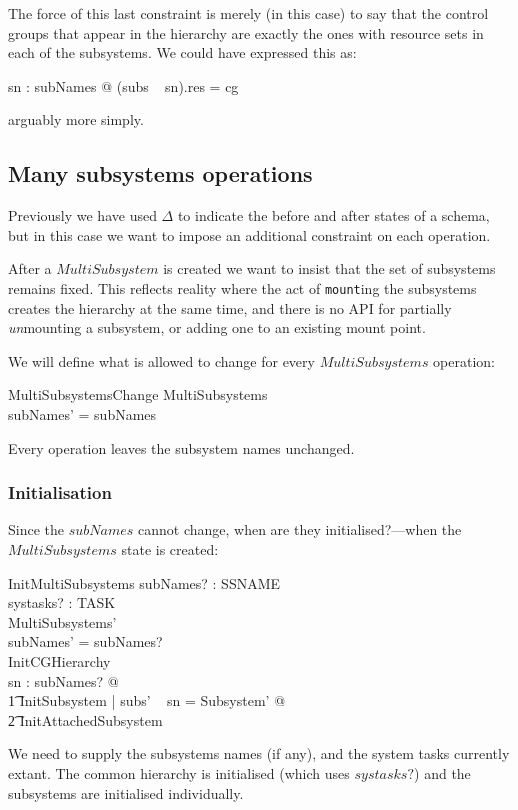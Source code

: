 \documentclass[a4paper,twoside,12pt]{article}
\begin{document}
The force of this last constraint is merely (in this case) to say that the control groups that appear in the
hierarchy are exactly the ones with resource sets in each of the subsystems. We could have expressed this as:

\begin{zed}
\forall sn : subNames @ \dom (subs ~ sn).res = \dom cg
\end{zed}
arguably more simply.

\subsection{Many subsystems operations}

Previously we have used $\Delta$ to indicate the before and after states of a schema, but in this case we want to
impose an additional constraint on each operation. 

After a $MultiSubsystem$ is created we want to insist that
the set of subsystems remains fixed. This reflects reality where the act of \texttt{mount}ing the subsystems creates the
hierarchy at the same time, and there is no API for partially \emph{un}mounting a subsystem, or adding one to an existing mount point.

We will define what is allowed to change for every $MultiSubsystems$ operation:

\begin{schema}{MultiSubsystemsChange}
\Delta MultiSubsystems \\
\where
subNames' = subNames \\
\end{schema}
Every operation leaves the subsystem names unchanged.

\subsubsection{Initialisation}

Since the $subNames$ cannot change, when are they initialised?---when the $MultiSubsystems$ state is created:

\begin{schema}{InitMultiSubsystems}
subNames? : \finset SSNAME \\
systasks? : \finset TASK \\
MultiSubsystems' \\
\where
subNames' = subNames? \\
InitCGHierarchy \\
\forall sn : subNames? @ \\
	\t1 \exists InitSubsystem | subs' ~ sn = \theta Subsystem' @ \\
		\t2 InitAttachedSubsystem 
\end{schema}
We need to supply the subsystems names (if any), and the system tasks currently extant. 
The common hierarchy is initialised (which uses $systasks?$)
and the subsystems are 
initialised individually. 
\end{document}
